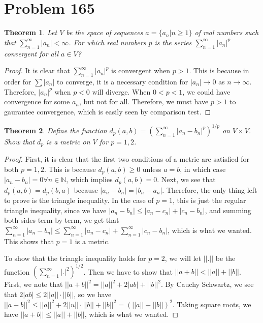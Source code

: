 \documentclass[psamsfonts]{amsart}
\newtheorem{thm}{Theorem}[section]
\theoremstyle{definition}
\theoremstyle{remark}
\numberwithin{equation}{section}
\begin{document}
\section{Problem 165}

\begin{thm}
Let $V$ be the space of sequences $a = \{ a_n | n \geq 1 \}$ of real numbers such that $\sum_{n=1}^\infty |a_n | < \infty$. For which real numbers $p$ is the series $\sum_{n=1}^\infty |a_n |^p$ convergent for all $a \in V$? 
\end{thm}

\begin{proof}
It is clear that $\sum_{n=1}^\infty |a_n|^p$ is convergent when $p > 1$. This is because in order for $\sum |a_n|$ to converge, it is a necessary condition for $|a_n| \to 0$ as $n \to \infty$. Therefore, $|a_n|^p$ when $p < 0$ will diverge. When $0 < p < 1$, we could have convergence for some $a_n$, but not for all. Therefore, we must have $p >1 $ to gaurantee convergence, which is easily seen by comparison test.   
\end{proof}

\begin{thm}
Define the function $d_p(a,b) = ( \sum_{n=1}^\infty |a_n - b_n|^p )^{1/p}$ on $V \times V$. Show that $d_p$ is a metric on $V$ for $p = 1,2$. 
\end{thm}

\begin{proof}
First, it is clear that the first two conditions of a metric are satisfied for both $p=1,2$. This is because $d_p(a,b) \geq 0$ unless $a = b$, in which case $|a_n - b_n| = 0 \forall n \in \mathbb{N}$, which implies $d_p(a,b) = 0$. Next, we see that $d_p(a,b) = d_p(b,a)$ because $|a_n - b_n| = |b_n - a_n|$. Therefore, the only thing left to prove is the triangle inequality. In the case of $p=1$, this is just the regular triangle inequality, since we have $|a_n - b_n | \leq |a_n - c_n| + |c_n - b_n|$, and summing both sides term by term, we get that $\sum_{n=1}^\infty |a_n - b_n| \leq \sum_{n=1}^\infty |a_n - c_n|  + \sum_{n=1}^\infty |c_n - b_n |$, which is what we wanted. This shows that $p=1$ is a metric.

To show that the triangle inequality holds for $p=2$, we will let $||.||$ be the function $(\sum_{n=1}^\infty |.|^2)^{1/2}$. Then we have to show that $||a + b|| < ||a|| + ||b||$. First, we note that $||a+b||^2 = ||a||^2 + 2 |a b| + ||b||^2$. By Cauchy Schwartz, we see that $2| a b| \leq 2 ||a|| \cdot ||b||$, so we have $||a + b||^2 \leq ||a||^2 + 2 ||u|| \cdot ||b|| + ||b||^2 = (||a|| + ||b||)^2$. Taking square roots, we have $||a+b|| \leq ||a|| + ||b||$, which is what we wanted. 
\end{proof}
\end{document}
